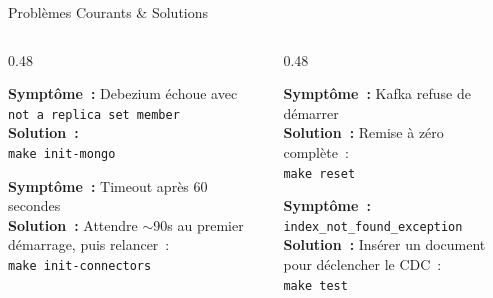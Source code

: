 \documentclass[aspectratio=169]{beamer}
\begin{document}
\begin{frame}{Problèmes Courants \& Solutions}
  \begin{columns}[T]
    \begin{column}{0.48\textwidth}
      \begin{tcolorbox}[card, colback=danger!8!surface, colframe=danger!40, boxrule=1pt, title={\faExclamationTriangle\ Replica Set Non Initialisé}]
        \scriptsize\textbf{Symptôme~:} Debezium échoue avec \texttt{not a replica set member}\\[0.3em]
        \textbf{Solution~:}\\
        \texttt{make init-mongo}
      \end{tcolorbox}
      \vspace{0.2cm}
      \begin{tcolorbox}[card, colback=danger!8!surface, colframe=danger!40, boxrule=1pt, title={\faExclamationTriangle\ Kafka Connect Pas Prêt}]
        \scriptsize\textbf{Symptôme~:} Timeout après 60 secondes\\[0.3em]
        \textbf{Solution~:} Attendre $\sim$90s au premier démarrage, puis relancer~:\\
        \texttt{make init-connectors}
      \end{tcolorbox}
    \end{column}
    \begin{column}{0.48\textwidth}
      \begin{tcolorbox}[card, colback=danger!8!surface, colframe=danger!40, boxrule=1pt, title={\faExclamationTriangle\ CLUSTER\_ID Kafka}]
        \scriptsize\textbf{Symptôme~:} Kafka refuse de démarrer\\[0.3em]
        \textbf{Solution~:} Remise à zéro complète~:\\
        \texttt{make reset}
      \end{tcolorbox}
      \vspace{0.2cm}
      \begin{tcolorbox}[card, colback=danger!8!surface, colframe=danger!40, boxrule=1pt, title={\faExclamationTriangle\ Index ES Manquant}]
        \scriptsize\textbf{Symptôme~:} \texttt{index\_not\_found\_exception}\\[0.3em]
        \textbf{Solution~:} Insérer un document pour déclencher le CDC~:\\
        \texttt{make test}
      \end{tcolorbox}
    \end{column}
  \end{columns}
\end{frame}
\end{document}
